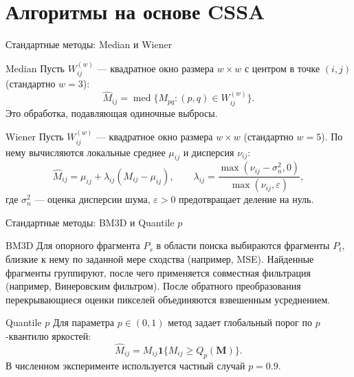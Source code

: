 \documentclass[unicode,notheorems]{beamer}
\begin{document}
\section{Алгоритмы на основе CSSA}

\begin{frame}{Стандартные методы: Median и Wiener}
	\scriptsize
	\begin{block}{Median}
		Пусть $W_{ij}^{(w)}$ --- квадратное окно размера $w\times w$ с центром в точке $(i,j)$ (стандартно $w=3$):
		\[
		\widehat M_{ij} =
		\operatorname{med}\{M_{pq}:(p,q)\in W_{ij}^{(w)}\}.
		\]
		Это обработка, подавляющая одиночные выбросы.
	\end{block}

	\begin{block}{Wiener}
		Пусть $W_{ij}^{(w)}$ --- квадратное окно размера $w\times w$ (стандартно $w=5$).
		По нему вычисляются локальные среднее $\mu_{ij}$ и дисперсия $\nu_{ij}$:
		\[
		\widehat M_{ij} =
		\mu_{ij}+\lambda_{ij}(M_{ij}-\mu_{ij}),\qquad
		\lambda_{ij}=
		\frac{\max(\nu_{ij}-\sigma_n^2,0)}{\max(\nu_{ij},\varepsilon)},
		\]
		где $\sigma_n^2$ --- оценка дисперсии шума, $\varepsilon>0$ предотвращает деление на нуль.
	\end{block}
\end{frame}

\begin{frame}{Стандартные методы: BM3D и Quantile $p$}
	\scriptsize
	\begin{block}{BM3D}
		Для опорного фрагмента $P_s$ в области поиска выбираются фрагменты $P_t$, близкие к нему по заданной мере сходства (например, MSE).
		Найденные фрагменты группируют, после чего применяется совместная фильтрация (например, Винеровским фильтром).
		После обратного преобразования перекрывающиеся оценки пикселей объединяются взвешенным усреднением.
	\end{block}

	\begin{block}{Quantile $p$}
		Для параметра $p\in(0,1)$ метод задает глобальный порог по $p$-квантилю яркостей:
		\[
		\widehat{M}_{ij}=M_{ij}\mathbf{1}\{M_{ij}\ge Q_{p}(\mathbf{M})\}.
		\]
		В численном эксперименте используется частный случай $p=0.9$.
	\end{block}
\end{frame}
\end{document}
